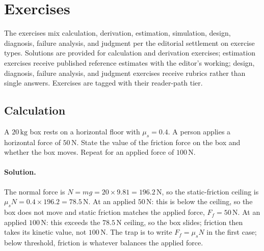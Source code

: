 \section{Exercises}

The exercises mix calculation, derivation, estimation, simulation,
design, diagnosis, failure analysis, and judgment per the editorial
settlement on exercise types. Solutions are provided for calculation
and derivation exercises; estimation exercises receive published
reference estimates with the editor's working; design, diagnosis,
failure analysis, and judgment exercises receive rubrics rather than
single answers. Exercises are tagged with their reader-path tier.

\subsection*{Calculation}

\begin{exercise}
A $20\,\si{\kilogram}$ box rests on a horizontal floor with $\mu_s =
0.4$. A person applies a horizontal force of $50\,\text{N}$. State
the value of the friction force on the box and whether the box
moves. Repeat for an applied force of $100\,\text{N}$.
\paragraph{Solution.} The normal force is $N = mg = 20 \times 9.81 =
196.2\,\text{N}$, so the static-friction ceiling is $\mu_s N = 0.4
\times 196.2 = 78.5\,\text{N}$. At an applied $50\,\text{N}$: this is
below the ceiling, so the box does not move and static friction matches
the applied force, $F_f = 50\,\text{N}$. At an applied $100\,\text{N}$:
this exceeds the $78.5\,\text{N}$ ceiling, so the box slides; friction
then takes its kinetic value, not $100\,\text{N}$. The trap is to write
$F_f = \mu_s N$ in the first case; below threshold, friction is whatever
balances the applied force.
\end{exercise}


